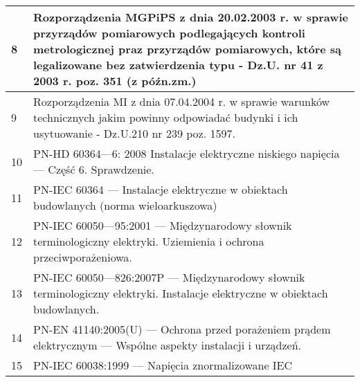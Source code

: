 {\begin{tabular}{ | p{} | p{} | }
        8  & Rozporządzenia MGPiPS z dnia 20.02.2003 r. w sprawie przyrządów pomiarowych podlegających kontroli metrologicznej praz przyrządów pomiarowych, które są legalizowane bez zatwierdzenia typu - Dz.U. nr 41 z 2003 r. poz. 351 (z późn.zm.)                                                               \\ \hline
        9  & Rozporządzenia MI z dnia 07.04.2004 r. w sprawie warunków technicznych jakim powinny odpowiadać budynki i ich usytuowanie - Dz.U.210 nr 239 poz. 1597.                                                                                                                                                  \\ \hline
        10 & PN-HD 60364—6: 2008 Instalacje elektryczne niskiego napięcia — Część 6. Sprawdzenie.                                                                                                                                                                                                                    \\ \hline
        11 & PN-IEC 60364 — Instalacje elektryczne w obiektach budowlanych (norma wieloarkuszowa)                                                                                                                                                                                                                    \\ \hline
        12 & PN-IEC 60050—95:2001 — Międzynarodowy słownik terminologiczny elektryki. Uziemienia i ochrona przeciwporażeniowa.                                                                                                                                                                                       \\ \hline
        13 & PN-IEC 60050—826:2007P — Międzynarodowy słownik terminologiczny elektryki. Instalacje elektryczne w obiektach budowlanych.                                                                                                                                                                              \\ \hline
        14 & PN-EN 41140:2005(U) — Ochrona przed porażeniem prądem elektrycznym — Wspólne aspekty instalacji i urządzeń.                                                                                                                                                                                             \\ \hline
        15 & PN-IEC 60038:1999 — Napięcia znormalizowane IEC                                                                                                                                                                                                                                                         \\ \hline

\end{tabular}}
